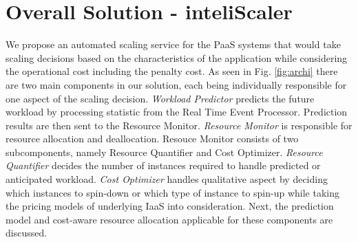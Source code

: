 \section{Overall Solution - inteliScaler}
We propose an automated scaling service for the PaaS systems that would take scaling decisions based on the characteristics of the application while considering the operational cost including the penalty cost. As seen in Fig. \ref{fig:archi} there are two main components in our solution, each being individually responsible for one aspect of the scaling decision. \textit{Workload Predictor} predicts the future workload by processing statistic from the Real Time Event Processor. Prediction results are then sent to the Resource Monitor. \textit{Resource Monitor} is responsible for resource allocation and deallocation. Resouce Monitor consists of two subcomponents, namely Resource Quantifier and Cost Optimizer. \textit{Resource Quantifier} decides the number of instances required to handle predicted or anticipated workload. \textit{Cost Optimizer} handles qualitative aspect by deciding which instances to spin-down or which type of instance to spin-up while taking the pricing models of underlying IaaS into consideration. Next, the prediction model and cost-aware resource allocation applicable for these components are discussed.